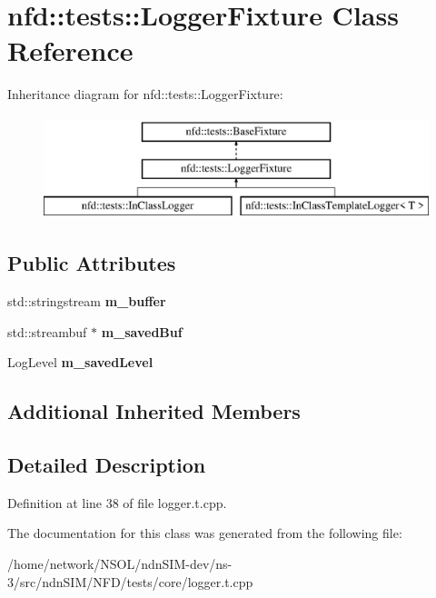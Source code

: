 \hypertarget{classnfd_1_1tests_1_1LoggerFixture}{}\section{nfd\+:\+:tests\+:\+:Logger\+Fixture Class Reference}
\label{classnfd_1_1tests_1_1LoggerFixture}
Inheritance diagram for nfd\+:\+:tests\+:\+:Logger\+Fixture\+:\begin{figure}[H]
\begin{center}
\leavevmode
\includegraphics[height=3.000000cm]{classnfd_1_1tests_1_1LoggerFixture}
\end{center}
\end{figure}
\subsection*{Public Attributes}
\begin{DoxyCompactItemize}
\item 
std\+::stringstream {\bfseries m\+\_\+buffer}\hypertarget{classnfd_1_1tests_1_1LoggerFixture_aa7bb8908c91a6e10d0c393beb0309604}{}\label{classnfd_1_1tests_1_1LoggerFixture_aa7bb8908c91a6e10d0c393beb0309604}

\item 
std\+::streambuf $\ast$ {\bfseries m\+\_\+saved\+Buf}\hypertarget{classnfd_1_1tests_1_1LoggerFixture_a3a2618b57a51163841aa13aee48e70b4}{}\label{classnfd_1_1tests_1_1LoggerFixture_a3a2618b57a51163841aa13aee48e70b4}

\item 
Log\+Level {\bfseries m\+\_\+saved\+Level}\hypertarget{classnfd_1_1tests_1_1LoggerFixture_aa7ff7eeceb12898809b3d5109ce03570}{}\label{classnfd_1_1tests_1_1LoggerFixture_aa7ff7eeceb12898809b3d5109ce03570}

\end{DoxyCompactItemize}
\subsection*{Additional Inherited Members}


\subsection{Detailed Description}


Definition at line 38 of file logger.\+t.\+cpp.



The documentation for this class was generated from the following file\+:\begin{DoxyCompactItemize}
\item 
/home/network/\+N\+S\+O\+L/ndn\+S\+I\+M-\/dev/ns-\/3/src/ndn\+S\+I\+M/\+N\+F\+D/tests/core/logger.\+t.\+cpp\end{DoxyCompactItemize}
